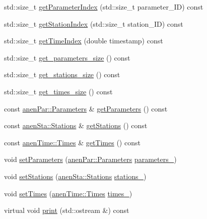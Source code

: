 \begin{DoxyCompactItemize}
\item 
std\+::size\+\_\+t \mbox{\hyperlink{class_observations_a73897578d7e1d4aaf6023857db896ee8}{get\+Parameter\+Index}} (std\+::size\+\_\+t parameter\+\_\+\+ID) const
\item 
std\+::size\+\_\+t \mbox{\hyperlink{class_observations_aa485e3d95a967b9b4efd5c4efaf0c9e1}{get\+Station\+Index}} (std\+::size\+\_\+t station\+\_\+\+ID) const
\item 
std\+::size\+\_\+t \mbox{\hyperlink{class_observations_a60c87d96be325c830c88d83bb60353ef}{get\+Time\+Index}} (double timestamp) const
\item 
std\+::size\+\_\+t \mbox{\hyperlink{class_observations_a4ae6818f6d01490eb14d63ce51a1d331}{get\+\_\+parameters\+\_\+size}} () const
\item 
std\+::size\+\_\+t \mbox{\hyperlink{class_observations_a30f67730e600545cf8cb9d7aed13bd33}{get\+\_\+stations\+\_\+size}} () const
\item 
std\+::size\+\_\+t \mbox{\hyperlink{class_observations_a352e34f7c278c86f54c69def24dabcd1}{get\+\_\+times\+\_\+size}} () const
\item 
const \mbox{\hyperlink{classanen_par_1_1_parameters}{anen\+Par\+::\+Parameters}} \& \mbox{\hyperlink{class_observations_a5347196195a72495217dc0614c9224c2}{get\+Parameters}} () const
\item 
const \mbox{\hyperlink{classanen_sta_1_1_stations}{anen\+Sta\+::\+Stations}} \& \mbox{\hyperlink{class_observations_a0f6deefe6b26a0546ea6d7642d190bfa}{get\+Stations}} () const
\item 
const \mbox{\hyperlink{classanen_time_1_1_times}{anen\+Time\+::\+Times}} \& \mbox{\hyperlink{class_observations_aa0929286a88fe261af73cc67c6c8df92}{get\+Times}} () const
\item 
void \mbox{\hyperlink{class_observations_a6965bc35582ce23ed840e9e6bf1fa228}{set\+Parameters}} (\mbox{\hyperlink{classanen_par_1_1_parameters}{anen\+Par\+::\+Parameters}} \mbox{\hyperlink{class_observations_a9e80eaaa9c096dda1dbbe8fcf631c087}{parameters\+\_\+}})
\item 
void \mbox{\hyperlink{class_observations_a01ddf7eb5d0b9c3fec31731a931cfdf4}{set\+Stations}} (\mbox{\hyperlink{classanen_sta_1_1_stations}{anen\+Sta\+::\+Stations}} \mbox{\hyperlink{class_observations_a03e2d3c69e46066f48e4381657a995f7}{stations\+\_\+}})
\item 
void \mbox{\hyperlink{class_observations_a28c65d41c60cb95607e06d090d03a8d2}{set\+Times}} (\mbox{\hyperlink{classanen_time_1_1_times}{anen\+Time\+::\+Times}} \mbox{\hyperlink{class_observations_ad379be63239b03e0db53dc31014a2d74}{times\+\_\+}})
\item 
virtual void \mbox{\hyperlink{class_observations_a523647c5ae644959f0ed583cd7b11aba}{print}} (std\+::ostream \&) const
\end{DoxyCompactItemize}
